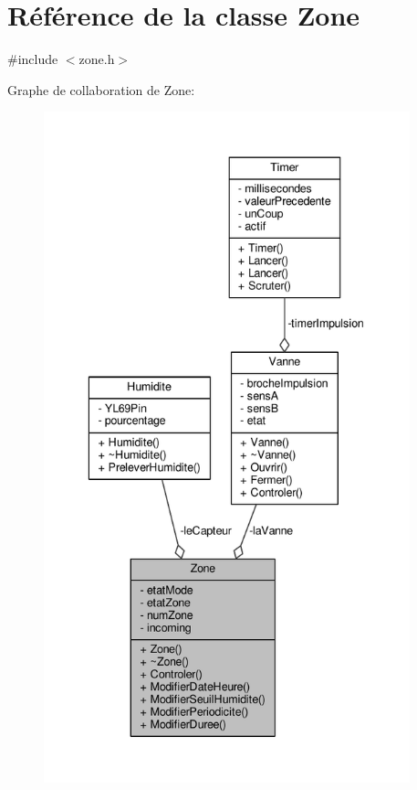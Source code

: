 \hypertarget{class_zone}{}\section{Référence de la classe Zone}
\label{class_zone}


{\ttfamily \#include $<$zone.\+h$>$}



Graphe de collaboration de Zone\+:\nopagebreak
\begin{figure}[H]
\begin{center}
\leavevmode
\includegraphics[height=550pt]{class_zone__coll__graph}
\end{center}
\end{figure}
